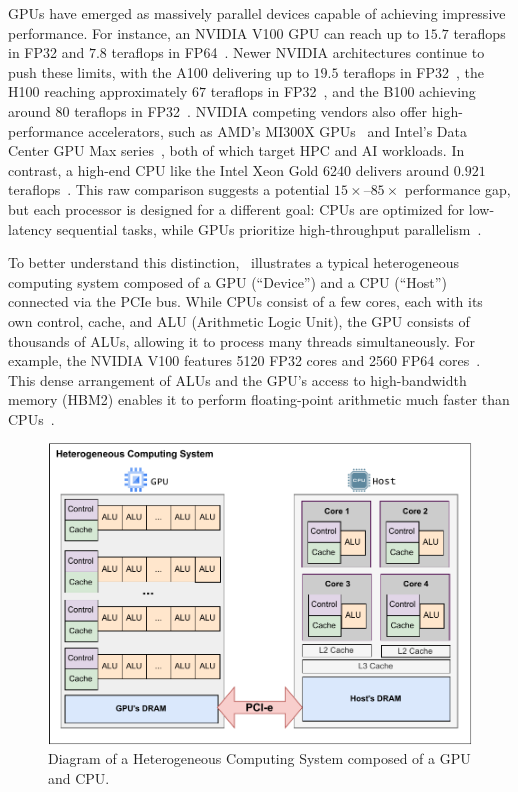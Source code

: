 \documentclass[Ingles,Final]{ic-tese-v3}
\begin{document}
GPUs have emerged as massively parallel devices capable of achieving impressive performance. For instance, an NVIDIA V100 GPU can reach up to $15.7$ teraflops in FP32 and $7.8$ teraflops in FP64~\cite{v100}. Newer NVIDIA architectures continue to push these limits, with the A100 delivering up to $19.5$ teraflops in FP32~\cite{a100}, the H100 reaching approximately $67$ teraflops in FP32~\cite{h100}, and the B100 achieving around $80$ teraflops in FP32~\cite{b100}. NVIDIA competing vendors also offer high-performance accelerators, such as AMD’s MI300X GPUs~\cite{amdmi300x} and Intel’s Data Center GPU Max series~\cite{intelgpu}, both of which target HPC and AI workloads. In contrast, a high-end CPU like the Intel Xeon Gold 6240 delivers around $0.921$ teraflops~\cite{xeon}. This raw comparison suggests a potential $15\times$–$85\times$ performance gap, but each processor is designed for a different goal: CPUs are optimized for low-latency sequential tasks, while GPUs prioritize high-throughput parallelism~\cite{kirk}.


To better understand this distinction,~ illustrates a typical heterogeneous computing system composed of a GPU (``Device'') and a CPU (``Host'') connected via the PCIe bus. While CPUs consist of a few cores, each with its own control, cache, and ALU (Arithmetic Logic Unit), the GPU consists of thousands of ALUs, allowing it to process many threads simultaneously. For example, the NVIDIA V100 features 5120 FP32 cores and 2560 FP64 cores~\cite{v100}. This dense arrangement of ALUs and the GPU's access to high-bandwidth memory (HBM2) enables it to perform floating-point arithmetic much faster than CPUs~\cite{kirk}.

\begin{figure}[h!]
    \centering
    \includegraphics[width=0.95\linewidth,clip]{figures/gpu.pdf}
    \caption[System with GPU and CPU diagram]{Diagram of a Heterogeneous Computing System composed of a GPU and CPU.}
    \label{fig:gpu}
\end{figure}
\end{document}
